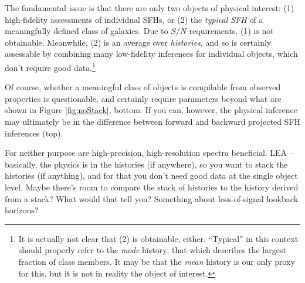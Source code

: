 \documentclass[a4paper,fleqn,usenatbib]{mnras}
\newcommand{\bfr}{\bf\color{red}}
\newcommand{\bfb}{\color{myblue}}
\begin{document}
The fundamental issue is that there are only two objects of physical interest: (1) high-fidelity assessments
of  individual SFHs, or (2) the {\it typical SFH} of a meaningfully defined class of galaxies. Due to 
$S/N$ requirements, (1) is not obtainable. Meanwhile, (2) is an average over {\it histories}, and so is 
certainly assessable by combining many low-fidelity inferences for individual objects, which don't require 
good data.\footnote{It is actually not clear that (2) is obtainable, either. ``Typical''
in this context should properly refer to the {\it mode} history; that which describes the largest 
fraction of class members. It may be that the {\it mean} history is our only proxy for this, but
it is not in reality the object of interest.} %

Of course, whether a meaningful class of objects is compilable from observed properties is questionable,
and certainly require parameters beyond what are shown in Figure \ref{fig:noStack}, bottom. If you can, 
however, the physical inference may ultimately be in the difference between forward and backward 
projected SFH inferences (top). 

For neither purpose are high-precision, high-resolution spectra beneficial. {\bfb LEA -- basically,
the physics is in the histories (if anywhere), so you want to stack the histories (if anything), and 
for that you don't need good data at the single object level. Maybe there's room to compare
the stack of histories to the history derived from a stack? What would that tell you? Something
about loss-of-signal lookback horizons?}



\end{document}
